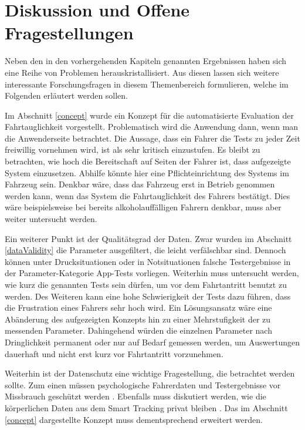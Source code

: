 \section{Diskussion und Offene Fragestellungen}
\label{openChallenges}

Neben den in den vorhergehenden Kapiteln genannten Ergebnissen haben sich eine Reihe von Problemen herauskristallisiert. Aus diesen lassen sich weitere interessante Forschungsfragen in diesem Themenbereich formulieren, welche im Folgenden erläutert werden sollen.

Im Abschnitt \ref{concept} wurde ein Konzept für die automatisierte Evaluation der Fahrtauglichkeit vorgestellt. Problematisch wird die Anwendung dann, wenn man die Anwenderseite betrachtet. Die Aussage, dass ein Fahrer die Tests zu jeder Zeit freiwillig vornehmen wird, ist als sehr kritisch einzustufen. Es bleibt zu betrachten, wie hoch die Bereitschaft auf Seiten der Fahrer ist, dass aufgezeigte System einzusetzen. Abhilfe könnte hier eine Pflichteinrichtung des Systems im Fahrzeug sein. Denkbar wäre, dass das Fahrzeug erst in Betrieb genommen werden kann, wenn das System die Fahrtauglichkeit des Fahrers bestätigt. Dies wäre beispielsweise bei bereits alkoholauffälligen Fahrern denkbar, muss aber weiter untersucht werden.  

 Ein weiterer Punkt ist der Qualitätsgrad der Daten. Zwar wurden im Abschnitt \ref{dataValidity} die Parameter ausgefiltert, die leicht verfälschbar sind. Dennoch können unter Drucksituationen oder in Notsituationen falsche Testergebnisse in der Parameter-Kategorie App-Tests vorliegen. Weiterhin muss untersucht werden, wie kurz die genannten Tests sein dürfen, um vor dem Fahrtantritt benutzt zu werden. Des Weiteren kann eine hohe Schwierigkeit der Tests dazu führen, dass die Frustration eines Fahrers sehr hoch wird.  Ein Lösungsansatz wäre eine Abänderung des aufgezeigten Konzepts hin zu einer Mehrstufigkeit der zu messenden Parameter. Dahingehend würden die einzelnen Parameter nach Dringlichkeit permanent oder nur auf Bedarf gemessen werden, um Auswertungen dauerhaft und nicht erst kurz vor Fahrtantritt vorzunehmen.

Weiterhin ist der Datenschutz eine wichtige Fragestellung, die betrachtet werden sollte. Zum einen müssen psychologische Fahrerdaten und Testergebnisse vor Missbrauch geschützt werden \cite{beurteilungskriterienleipzig}. Ebenfalls muss diskutiert werden, wie die körperlichen Daten aus dem Smart Tracking privat bleiben \cite{securityprivacyfitnesstracking}. Das im Abschnitt \ref{concept} dargestellte Konzept muss dementsprechend erweitert werden.

